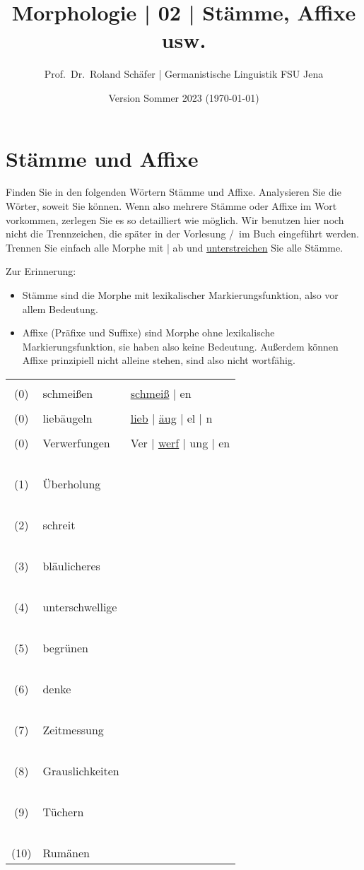 \documentclass[12pt,a4paper,twoside]{article}
\author{Prof.\ Dr.\ Roland Schäfer | Germanistische Linguistik FSU Jena}
\title{Morphologie | 02 | Stämme, Affixe usw.}
\date{Version Sommer 2023 (\today)}
\newcommand{\grau}[1]{\textcolor{grau}{#1}}
\newcommand{\Lf}{
  \setlength{\itemsep}{1pt}
  \setlength{\parskip}{0pt}
  \setlength{\parsep}{0pt}
}
\begin{document}
\maketitle

\section{Stämme und Affixe}\label{sec:form}

Finden Sie in den folgenden Wörtern Stämme und Affixe.
Analysieren Sie die Wörter, soweit Sie können.
Wenn also mehrere Stämme oder Affixe im Wort vorkommen, zerlegen Sie es so detailliert wie möglich.
Wir benutzen hier noch nicht die Trennzeichen, die später in der Vorlesung \slash\ im Buch eingeführt werden.
Trennen Sie einfach alle Morphe mit | ab und \ul{unterstreichen} Sie alle Stämme.

Zur Erinnerung:

\begin{itemize}\Lf
  \item Stämme sind die Morphe mit lexikalischer Markierungsfunktion, also vor allem Bedeutung.
  \item Affixe (Präfixe und Suffixe) sind Morphe ohne lexikalische Markierungsfunktion, sie haben also keine Bedeutung.
    Außerdem können Affixe prinzipiell nicht alleine stehen, sind also nicht wortfähig.
\end{itemize}

\begin{tabular}[h]{cp{}p{}}
  &&\\
  (0) & \grau{schmeißen} & \ul{schmeiß} | en\\
  &&\\
  (0) & \grau{liebäugeln} & \ul{lieb} | \ul{äug} | el | n\\
  &&\\
  (0) & \grau{Verwerfungen} & Ver | \ul{werf} | ung | en \\
  && \\
  (1) & Überholung & \\ \cline{3-3}
  && \\
  (2) & schreit & \\ \cline{3-3}
  && \\
  (3) & bläulicheres & \\ \cline{3-3}
  && \\
  (4) & unterschwellige & \\ \cline{3-3}
  && \\
  (5) & begrünen & \\ \cline{3-3}
  && \\
  (6) & denke & \\ \cline{3-3}
  && \\
  (7) & Zeitmessung & \\ \cline{3-3}
  && \\
  (8) & Grauslichkeiten & \\ \cline{3-3}
  && \\
  (9) & Tüchern & \\ \cline{3-3}
  && \\
  (10) & Rumänen & \\ \cline{3-3}
\end{tabular}
\end{document}

